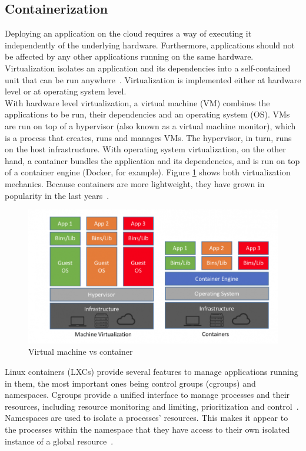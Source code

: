 \subsection{Containerization}
Deploying an application on the cloud requires a way of executing it independently of the underlying hardware. Furthermore, applications should not be affected by any other applications running on the same hardware. Virtualization isolates an application and its dependencies into a self-contained unit that can be run anywhere~\citep{Virtualization}.
Virtualization is implemented either at hardware level or at operating system level. \\

With hardware level virtualization, a virtual machine (VM) combines the applications to be run, their dependencies and an operating system (OS). VMs are run on top of a hypervisor (also known as a virtual machine monitor), which is a process that creates, runs and manages VMs. The hypervisor, in turn, runs on the host infrastructure. With operating system virtualization, on the other hand, a container bundles the application and its dependencies, and is run on top of a container engine (Docker, for example). Figure \ref{fig:container_vs_vm} shows both virtualization mechanics. Because containers are more lightweight, they have grown in popularity in the last years~\citep{Container}. \\

\begin{figure}
\begin{center}
\includegraphics[width=0.9 \columnwidth]{Images/VM_vs_container.png}
\end{center}
\caption{Virtual machine vs container~\citep{Container-vs-vm}}
\label{fig:container_vs_vm}
\end{figure}

\newpage

Linux containers (LXCs) provide several features to manage applications running in them, the most important ones being control groups (cgroups) and namespaces. Cgroups provide a unified interface to manage processes and their resources, including resource monitoring and limiting, prioritization and control~\citep{Cgroup}. Namespaces are used to isolate a processes' resources. This makes it appear to the processes within the namespace that they have access to their own isolated instance of a global resource~\citep{Namespace}.

